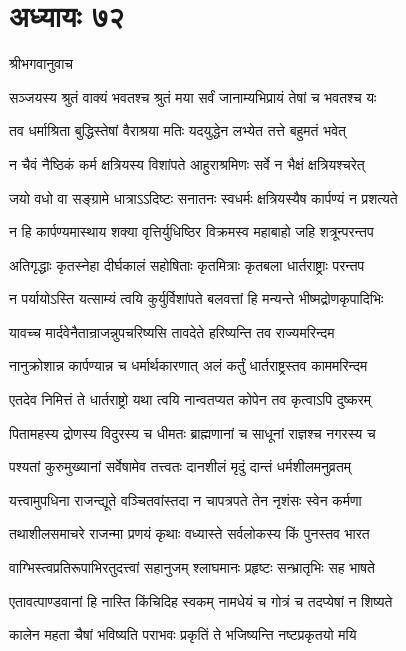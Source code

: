 \chapter{अध्यायः ७२}
\twolineshloka
{श्रीभगवानुवाच}
{}


\twolineshloka
{सञ्जयस्य श्रुतं वाक्यं भवतश्च श्रुतं मया}
{सर्वं जानाम्यभिप्रायं तेषां च भवतश्च यः}


\twolineshloka
{तव धर्माश्रिता बुद्धिस्तेषां वैराश्रया मतिः}
{यदयुद्धेन लभ्येत तत्ते बहुमतं भवेत्}


\twolineshloka
{न चैवं नैष्ठिकं कर्म क्षत्रियस्य विशांपते}
{आहुराश्रमिणः सर्वे न भैक्षं क्षत्रियश्चरेत्}


\twolineshloka
{जयो वधो वा सङ्ग्रामे धात्राऽऽदिष्टः सनातनः}
{स्वधर्मः क्षत्रियस्यैष कार्पण्यं न प्रशत्यते}


\twolineshloka
{न हि कार्पण्यमास्थाय शक्या वृत्तिर्युधिष्ठिर}
{विक्रमस्व महाबाहो जहि शत्रून्परन्तप}


\twolineshloka
{अतिगृद्धाः कृतस्नेहा दीर्घकालं सहोषिताः}
{कृतमित्राः कृतबला धार्तराष्ट्राः परन्तप}


\twolineshloka
{न पर्यायोऽस्ति यत्साम्यं त्वयि कुर्युर्विशांपते}
{बलवत्तां हि मन्यन्ते भीष्मद्रोणकृपादिभिः}


\twolineshloka
{यावच्च मार्दवेनैतान्राजन्नुपचरिष्यसि}
{तावदेते हरिष्यन्ति तव राज्यमरिन्दम}


\twolineshloka
{नानुक्रोशान्न कार्पण्यान्न च धर्मार्थकारणात्}
{अलं कर्तुं धार्तराष्ट्रस्तव काममरिन्दम}


\twolineshloka
{एतदेव निमित्तं ते धार्तराष्ट्रो यथा त्वयि}
{नान्वतप्यत कोपेन तव कृत्वाऽपि दुष्करम्}


\twolineshloka
{पितामहस्य द्रोणस्य विदुरस्य च धीमतः}
{ब्राह्मणानां च साधूनां राज्ञश्च नगरस्य च}


\twolineshloka
{पश्यतां कुरुमुख्यानां सर्वेषामेव तत्त्वतः}
{दानशीलं मृदुं दान्तं धर्मशीलमनुव्रतम्}


\twolineshloka
{यत्त्वामुपधिना राजन्द्यूते वञ्चितवांस्तदा}
{न चापत्रपते तेन नृशंसः स्वेन कर्मणा}


\twolineshloka
{तथाशीलसमाचरे राजन्मा प्रणयं कृथाः}
{वध्यास्ते सर्वलोकस्य किं पुनस्तव भारत}


\twolineshloka
{वाग्भिस्त्वप्रतिरूपाभिरतुदत्त्वां सहानुजम्}
{श्लाघमानः प्रहृष्टः सन्भ्रातृभिः सह भाषते}


\twolineshloka
{एतावत्पाण्डवानां हि नास्ति किंचिदिह स्वकम्}
{नामधेयं च गोत्रं च तदप्येषां न शिष्यते}


\twolineshloka
{कालेन महता चैषां भविष्यति पराभवः}
{प्रकृतिं ते भजिष्यन्ति नष्टप्रकृतयो मयि}


